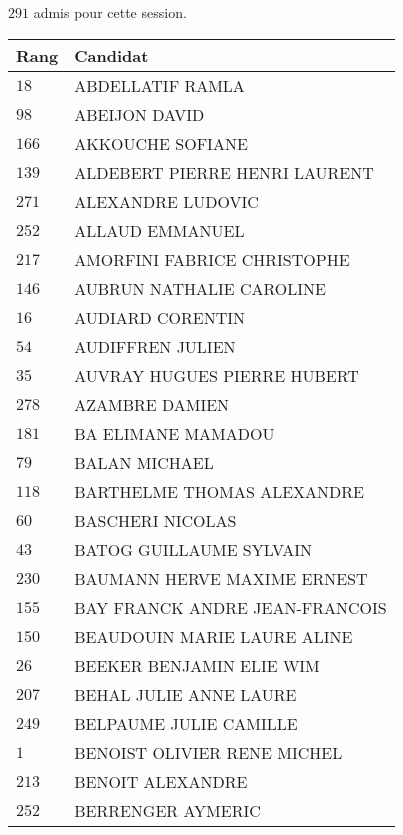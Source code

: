 



  $291$ admis pour cette session.

  \begin{xltabular}{\linewidth}{|l|X|}
    \hline
    \textbf{Rang} & \textbf{Candidat} \\
    \hline
    $18$ & ABDELLATIF RAMLA \\
    \hline
    $98$ & ABEIJON DAVID \\
    \hline
    $166$ & AKKOUCHE SOFIANE \\
    \hline
    $139$ & ALDEBERT PIERRE HENRI LAURENT \\
    \hline
    $271$ & ALEXANDRE LUDOVIC \\
    \hline
    $252$ & ALLAUD EMMANUEL \\
    \hline
    $217$ & AMORFINI FABRICE CHRISTOPHE \\
    \hline
    $146$ & AUBRUN NATHALIE CAROLINE \\
    \hline
    $16$ & AUDIARD CORENTIN \\
    \hline
    $54$ & AUDIFFREN JULIEN \\
    \hline
    $35$ & AUVRAY HUGUES PIERRE HUBERT \\
    \hline
    $278$ & AZAMBRE DAMIEN \\
    \hline
    $181$ & BA ELIMANE MAMADOU \\
    \hline
    $79$ & BALAN MICHAEL \\
    \hline
    $118$ & BARTHELME THOMAS ALEXANDRE \\
    \hline
    $60$ & BASCHERI NICOLAS \\
    \hline
    $43$ & BATOG GUILLAUME SYLVAIN \\
    \hline
    $230$ & BAUMANN HERVE MAXIME ERNEST \\
    \hline
    $155$ & BAY FRANCK ANDRE JEAN-FRANCOIS \\
    \hline
    $150$ & BEAUDOUIN MARIE LAURE ALINE \\
    \hline
    $26$ & BEEKER BENJAMIN ELIE WIM \\
    \hline
    $207$ & BEHAL JULIE ANNE LAURE \\
    \hline
    $249$ & BELPAUME JULIE CAMILLE \\
    \hline
    $1$ & BENOIST OLIVIER RENE MICHEL \\
    \hline
    $213$ & BENOIT ALEXANDRE \\
    \hline
    $252$ & BERRENGER AYMERIC \\

\end{xltabular}
